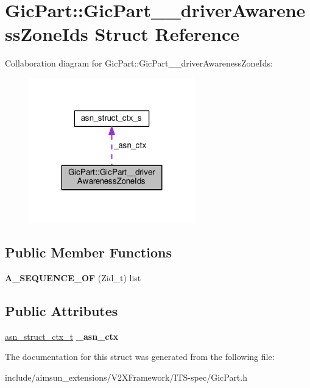 \hypertarget{structGicPart_1_1GicPart____driverAwarenessZoneIds}{}\section{Gic\+Part\+:\+:Gic\+Part\+\_\+\+\_\+driver\+Awareness\+Zone\+Ids Struct Reference}
\label{structGicPart_1_1GicPart____driverAwarenessZoneIds}


Collaboration diagram for Gic\+Part\+:\+:Gic\+Part\+\_\+\+\_\+driver\+Awareness\+Zone\+Ids\+:\nopagebreak
\begin{figure}[H]
\begin{center}
\leavevmode
\includegraphics[width=203pt]{structGicPart_1_1GicPart____driverAwarenessZoneIds__coll__graph}
\end{center}
\end{figure}
\subsection*{Public Member Functions}
\begin{DoxyCompactItemize}
\item 
{\bfseries A\+\_\+\+S\+E\+Q\+U\+E\+N\+C\+E\+\_\+\+OF} (Zid\+\_\+t) list\hypertarget{structGicPart_1_1GicPart____driverAwarenessZoneIds_a83aff1f73d54e1ab54aa997983917475}{}\label{structGicPart_1_1GicPart____driverAwarenessZoneIds_a83aff1f73d54e1ab54aa997983917475}

\end{DoxyCompactItemize}
\subsection*{Public Attributes}
\begin{DoxyCompactItemize}
\item 
\hyperlink{structasn__struct__ctx__s}{asn\+\_\+struct\+\_\+ctx\+\_\+t} {\bfseries \+\_\+asn\+\_\+ctx}\hypertarget{structGicPart_1_1GicPart____driverAwarenessZoneIds_a3b0e4366722da8d4d33ce89a27172a08}{}\label{structGicPart_1_1GicPart____driverAwarenessZoneIds_a3b0e4366722da8d4d33ce89a27172a08}

\end{DoxyCompactItemize}


The documentation for this struct was generated from the following file\+:\begin{DoxyCompactItemize}
\item 
include/aimsun\+\_\+extensions/\+V2\+X\+Framework/\+I\+T\+S-\/spec/Gic\+Part.\+h\end{DoxyCompactItemize}
